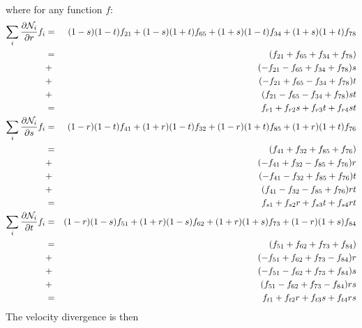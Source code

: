 where for any function $f$:
\begin{eqnarray}
\sum_i
\frac{\partial {\mathcal{N}}_i}{\partial r} f_i 
&=&
 (1-s)(1-t)f_{21}
+(1-s)(1+t)f_{65}
+(1+s)(1-t)f_{34}
+(1+s)(1+t)f_{78} 
\nonumber\\
&=& ( f_{21}+f_{65}+f_{34}+f_{78}) \nonumber\\
&+& (-f_{21}-f_{65}+f_{34}+f_{78})s \nonumber\\
&+& (-f_{21}+f_{65}-f_{34}+f_{78})t \nonumber\\
&+& ( f_{21}-f_{65}-f_{34}+f_{78})st 
\nonumber\\
&=& f_{r1} + f_{r2}s + f_{r3}t + f_{r4} st \nonumber\\ 
\sum_i
\frac{\partial {\mathcal{N}}_i}{\partial s} f_i 
&=&
 (1-r)(1-t)f_{41}
+(1+r)(1-t)f_{32}
+(1-r)(1+t)f_{85}
+(1+r)(1+t)f_{76} \nonumber\\
&=&
   ( f_{41}+f_{32}+f_{85}+f_{76})  \nonumber\\
&+&(-f_{41}+f_{32}-f_{85}+f_{76})r \nonumber\\
&+&(-f_{41}-f_{32}+f_{85}+f_{76})t \nonumber\\
&+&( f_{41}-f_{32}-f_{85}+f_{76})rt
\nonumber\\
&=& f_{s1} + f_{s2}r + f_{s3}t + f_{s4} rt \nonumber\\ 
\sum_i
\frac{\partial {\mathcal{N}}_i}{\partial t} f_i 
&=&
 (1-r)(1-s)f_{51}
+(1+r)(1-s)f_{62}
+(1+r)(1+s)f_{73}
+(1-r)(1+s)f_{84} \nonumber\\
&=&( f_{51}+f_{62}+f_{73}+f_{84}) \nonumber\\ 
&+&(-f_{51}+f_{62}+f_{73}-f_{84})r\nonumber\\
&+&(-f_{51}-f_{62}+f_{73}+f_{84})s\nonumber\\
&+&( f_{51}-f_{62}+f_{73}-f_{84})rs
\nonumber\\
&=& f_{t1} + f_{t2}r + f_{t3}s + f_{t4} rs \nonumber
\end{eqnarray}
The velocity divergence is then 
